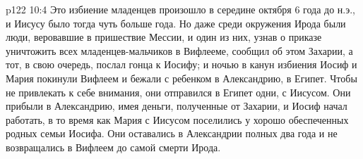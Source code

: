 \vs p122 10:4 Это избиение младенцев произошло в середине октября 6 года до н.э., и Иисусу было тогда чуть больше года. Но даже среди окружения Ирода были люди, веровавшие в пришествие Мессии, и один из них, узнав о приказе уничтожить всех младенцев\hyp{}мальчиков в Вифлееме, сообщил об этом Захарии, а тот, в свою очередь, послал гонца к Иосифу; и ночью в канун избиения Иосиф и Мария покинули Вифлеем и бежали с ребенком в Александрию, в Египет. Чтобы не привлекать к себе внимания, они отправился в Египет одни, с Иисусом. Они прибыли в Александрию, имея деньги, полученные от Захарии, и Иосиф начал работать, в то время как Мария с Иисусом поселились у хорошо обеспеченных родных семьи Иосифа. Они оставались в Александрии полных два года и не возвращались в Вифлеем до самой смерти Ирода.
